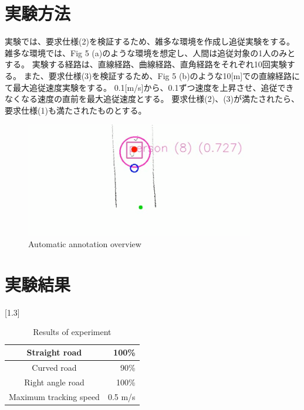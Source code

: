 \section{実験方法}
実験では、要求仕様(2)を検証するため、雑多な環境を作成し追従実験をする。
雑多な環境では、Fig 5 (a)のような環境を想定し、人間は追従対象の1人のみとする。
実験する経路は、直線経路、曲線経路、直角経路をそれぞれ10回実験する。
また、要求仕様(3)を検証するため、Fig 5 (b)のような10[m]での直線経路にて最大追従速度実験をする。
0.1[m/s]から、0.1ずつ速度を上昇させ、追従できなくなる速度の直前を最大追従速度とする。
要求仕様(2)、(3)が満たされたら、要求仕様(1)も満たされたものとする。

\begin{figure}[b]
\begin{center}
\includegraphics[width=100mm,clip]{figure/person_detector_laser_img2.png}
\caption{Automatic annotation overview}
\label{Generation of target coordinates}
\end{center}
\end{figure}

\section{実験結果}

\begin{table}[tb]
    \begin{center}
      \caption{{Results of experiment}\label{Result}}
      \scalebox{1.5}[1.3]{
        \begin{tabular}{|c|r|} \hline
          Straight road & 100\% \\ \hline
          Curved road & 90\% \\ \hline
          Right angle road & 100\% \\ \hline
          Maximum tracking speed & 0.5 m/s \\ \hline
        \end{tabular}
      }
    \end{center}
\end{table}

